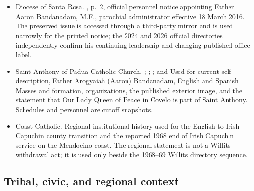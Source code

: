 \begin{itemize}[leftmargin=1.35em,itemsep=0.2em,topsep=0.2em]
\item Diocese of Santa Rosa. , p.~2, official personnel notice appointing Father Aaron Bandanadam, M.F., parochial administrator effective 18 March 2016. The preserved issue is accessed through a third-party mirror and is used narrowly for the printed notice; the 2024 and 2026 official directories independently confirm his continuing leadership and changing published office label.
\item Saint Anthony of Padua Catholic Church. ; ; ; and  Used for current self-description, Father Arogyaiah (Aaron) Bandanadam, English and Spanish Masses and formation, organizations, the published exterior image, and the statement that Our Lady Queen of Peace in Covelo is part of Saint Anthony. Schedules and personnel are cutoff snapshots.
\item Coast Catholic.  Regional institutional history used for the English-to-Irish Capuchin county transition and the reported 1968 end of Irish Capuchin service on the Mendocino coast. The regional statement is not a Willits withdrawal act; it is used only beside the 1968--69 Willits directory sequence.
\end{itemize}

\subsection{Tribal, civic, and regional context}

